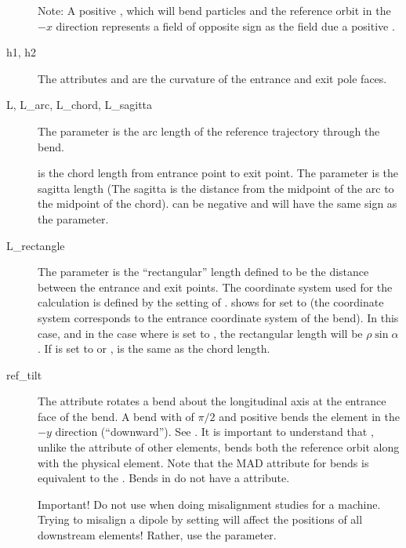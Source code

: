 \begin{description}
Note: A positive , which will bend particles and the reference orbit in the $-x$ direction
represents a field of opposite sign as the field due a positive .
  \item[h1, h2] \Newline
The attributes  and  are the curvature of the entrance and exit pole faces.
  \item[L, L_arc, L_chord, L_sagitta]  \Newline
The  parameter is the arc length of the reference trajectory through the bend.

 is the chord length from entrance point to exit point.
The  parameter is the sagitta length (The sagitta is the distance
from the midpoint of the arc to the midpoint of the chord).  can be negative and will have
the same sign as the  parameter.
  \item[L_rectangle] \Newline
The  parameter is the ``rectangular'' length defined to be the distance between the
entrance and exit points. The coordinate system used for the calculation is defined by the setting
of .  shows  for  set to
 (the coordinate system corresponds to the entrance coordinate system of the bend).
In this case, and in the case where  is set to , the rectangular
length will be $\rho \sin\alpha$. If  is set to  or ,
 is the same as the chord length.
  \item[ref_tilt] \Newline
The  attribute rotates a bend about the longitudinal axis at the entrance face of the
bend. A bend with  of $\pi/2$ and positive  bends the element in the $-y$
direction (``downward''). See . It is important to understand that ,
unlike the  attribute of other elements, bends both the reference orbit along with the
physical element. Note that the MAD  attribute for bends is equivalent to the \bmad
{}. Bends in \bmad do not have a  attribute.

Important! Do not use  when doing misalignment studies for a machine. Trying to misalign
a dipole by setting  will affect the positions of all downstream elements! Rather, use the
 parameter.
  \end{description}

